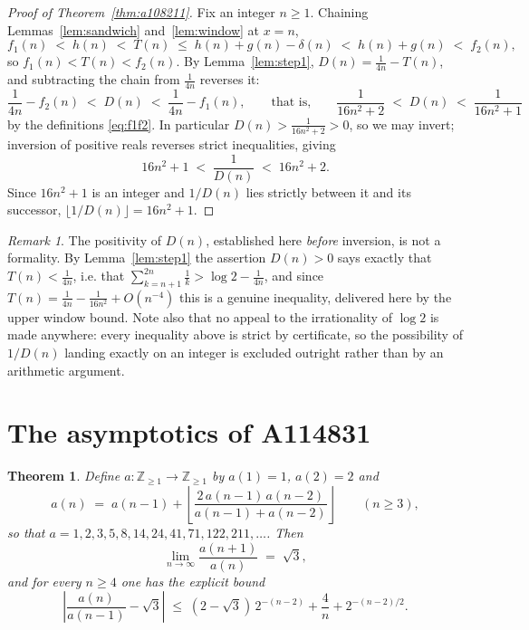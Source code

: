 \documentclass[11pt]{article}
\theoremstyle{plain}
\newtheorem{theorem}{Theorem}[section]
\theoremstyle{definition}
\theoremstyle{remark}
\newtheorem*{remark}{Remark}
\numberwithin{equation}{section}
\newcommand{\Z}{\mathbb{Z}}
\begin{document}
\begin{proof}[Proof of Theorem~\ref{thm:a108211}]
Fix an integer $n \ge 1$. Chaining Lemmas~\ref{lem:sandwich} and~\ref{lem:window} at $x = n$,
\[
  f_1(n) \;<\; h(n) \;<\; T(n) \;\le\; h(n) + g(n) - \delta(n) \;<\; h(n) + g(n) \;<\; f_2(n),
\]
so $f_1(n) < T(n) < f_2(n)$. By Lemma~\ref{lem:step1}, $D(n) = \frac{1}{4n} - T(n)$, and
subtracting the chain from $\frac{1}{4n}$ reverses it:
\[
  \frac{1}{4n} - f_2(n) \;<\; D(n) \;<\; \frac{1}{4n} - f_1(n),
  \qquad\text{that is,}\qquad
  \frac{1}{16n^2+2} \;<\; D(n) \;<\; \frac{1}{16n^2+1}
\]
by the definitions \eqref{eq:f1f2}. In particular $D(n) > \frac{1}{16n^2+2} > 0$, so we may
invert; inversion of positive reals reverses strict inequalities, giving
\[
  16n^2 + 1 \;<\; \frac{1}{D(n)} \;<\; 16n^2 + 2 .
\]
Since $16n^2+1$ is an integer and $1/D(n)$ lies strictly between it and its successor,
$\lfloor 1/D(n) \rfloor = 16n^2+1$.
\end{proof}

\begin{remark}
The positivity of $D(n)$, established here \emph{before} inversion, is not a formality. By
Lemma~\ref{lem:step1} the assertion $D(n) > 0$ says exactly that $T(n) < \frac{1}{4n}$, i.e.
that $\sum_{k=n+1}^{2n} \frac1k > \log 2 - \frac{1}{4n}$, and since
$T(n) = \frac{1}{4n} - \frac{1}{16n^2} + O(n^{-4})$ this is a genuine inequality, delivered here
by the upper window bound. Note also that no appeal to the irrationality of $\log 2$ is made
anywhere: every inequality above is strict by certificate, so the possibility of $1/D(n)$ landing
exactly on an integer is excluded outright rather than by an arithmetic argument.
\end{remark}

\section{The asymptotics of A114831}
\label{sec:a114831}

\begin{theorem}
\label{thm:a114831}
Define $a : \Z_{\ge 1} \to \Z_{\ge 1}$ by $a(1) = 1$, $a(2) = 2$ and
\[
  a(n) \;=\; a(n-1) + \left\lfloor \frac{2\,a(n-1)\,a(n-2)}{a(n-1)+a(n-2)} \right\rfloor
  \qquad (n \ge 3),
\]
so that $a = 1, 2, 3, 5, 8, 14, 24, 41, 71, 122, 211, \dots$. Then
\[
  \lim_{n \to \infty} \frac{a(n+1)}{a(n)} \;=\; \sqrt3 ,
\]
and for every $n \ge 4$ one has the explicit bound
\begin{equation}
  \left| \frac{a(n)}{a(n-1)} - \sqrt3 \right|
  \;\le\; (2-\sqrt3)\,2^{-(n-2)} + \frac{4}{n} + 2^{-(n-2)/2}.
  \label{eq:a114831bound}
\end{equation}
\end{theorem}
\end{document}
